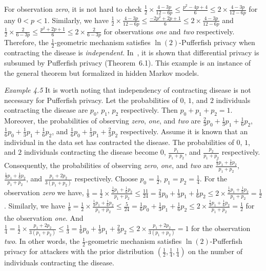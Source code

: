 For observation \textit{zero}, it is not hard to check $\frac{1}{2}
\times \frac{4-3p}{12-6p} \leq \frac{p^2 - 4p + 4}{6} \leq 2 \times
\frac{4-3p}{12-6p}$ for any $0 < p < 1$. Similarly, we have
$\frac{1}{2} \times
\frac{4-3p}{12-6p} \leq \frac{-2p^2 + 2p + 1}{6} \leq 2 \times
\frac{4-3p}{12-6p}$ and $\frac{1}{2} \times \frac{2}{6-3p} \leq
\frac{p^2 + 2p + 1}{6} \leq 2 \times \frac{2}{6-3p}$  for observations
\textit{one} and \textit{two} respectively. Therefore, the
$\frac{1}{2}$-geometric mechanism satisfies $\ln(2)$-Pufferfish
privacy when contracting the disease is \emph{independent}.
In~\cite{KM:14:PFMPD}, it is shown that differential privacy is
subsumed by Pufferfish privacy (Theorem~6.1). This example is an
instance of the general theorem but formalized in hidden Markov
models.

\noindent
\textit{Example 4.5}
It is worth noting that independency of contracting disease is not
necessary for Pufferfish privacy. Let the probabilities of $0$, $1$,
and $2$ individuals contracting the disease are $p_0$, $p_1$, $p_2$
respectively. Then $p_0 + p_1 + p_2 = 1$. Moreover, the probabilities
of observing \textit{zero}, \textit{one}, and \textit{two} are
$\frac{2}{3} p_0 + \frac{1}{3} p_1 + \frac{1}{6} p_2$,
$\frac{1}{6} p_0 + \frac{1}{3} p_1 + \frac{1}{6} p_2$, and
$\frac{1}{6} p_0 + \frac{1}{3} p_1 + \frac{2}{3} p_2$ respectively.
Assume it is known that an individual in the data set has contracted
the disease. The probabilities of $0$, $1$, and $2$ individuals
contracting the disease become $0$, $\frac{p_1}{p_1 + p_2}$, and
$\frac{p_2}{p_1 + p_2}$ respectively. Consequently, the probabilities
of observing \textit{zero}, \textit{one}, and \emph{two} are
$\frac{\frac{1}{3}p_1 + \frac{1}{6}p_2}{p_1 + p_2}$,
$\frac{\frac{1}{3}p_1 + \frac{1}{6}p_2}{p_1 + p_2}$, and
$\frac{p_1 + 2p_2}{3(p_1 + p_2)}$ respectively. Choose $p_0 =
\frac{1}{2}$, $p_1 = p_2 = \frac{1}{4}$. For the observation
\textit{zero} we have,
$\frac{1}{8} =
\frac{1}{2} \times \frac{\frac{1}{3}p_1 + \frac{1}{6}p_2}{p_1 + p_2}
\leq
\frac{11}{24} =
\frac{2}{3} p_0 + \frac{1}{3} p_1 + \frac{1}{6} p_2
\leq
{2} \times \frac{\frac{1}{3}p_1 + \frac{1}{6}p_2}{p_1 + p_2}
= \frac{1}{2}$.
Similarly, we have
$
\frac{1}{8} =
\frac{1}{2} \times \frac{\frac{1}{3}p_1 + \frac{1}{6}p_2}{p_1 + p_2}
\leq
\frac{5}{24} =
\frac{1}{6} p_0 + \frac{1}{3} p_1 + \frac{1}{6} p_2
\leq
2 \times \frac{\frac{1}{3}p_1 + \frac{1}{6}p_2}{p_1 + p_2}
= \frac{1}{2}$ for the observation \textit{one}. And
$
\frac{1}{4}
=
\frac{1}{2} \times \frac{p_1 + 2p_2}{3(p_1 + p_2)}
\leq
\frac{1}{3}
=
\frac{1}{6} p_0 + \frac{1}{3} p_1 + \frac{2}{3} p_2
\leq
2 \times \frac{p_1 + 2p_2}{3(p_1 + p_2)}
= 1$ for the observation \textit{two}. In other words, the
$\frac{1}{2}$-geometric mechanism satisfies $\ln(2)$-Pufferfish privacy for
attackers with the prior distribution $(\frac{1}{2}, \frac{1}{4},
\frac{1}{4})$ on the number of individuals contracting the disease.

